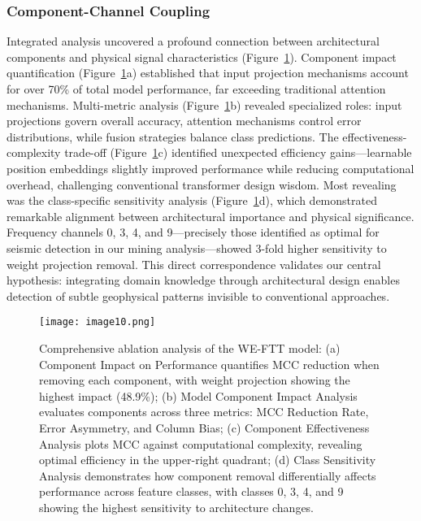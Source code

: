 \documentclass[fleqn,10pt]{wlscirep_mdpi_style}
\begin{document}
\subsubsection{Component-Channel Coupling}
Integrated analysis uncovered a profound connection between architectural components and physical signal characteristics (Figure~\ref{fig:fig10}). Component impact quantification (Figure~\ref{fig:fig10}a) established that input projection mechanisms account for over 70\% of total model performance, far exceeding traditional attention mechanisms. Multi-metric analysis (Figure~\ref{fig:fig10}b) revealed specialized roles: input projections govern overall accuracy, attention mechanisms control error distributions, while fusion strategies balance class predictions. The effectiveness-complexity trade-off (Figure~\ref{fig:fig10}c) identified unexpected efficiency gains—learnable position embeddings slightly improved performance while reducing computational overhead, challenging conventional transformer design wisdom.
Most revealing was the class-specific sensitivity analysis (Figure~\ref{fig:fig10}d), which demonstrated remarkable alignment between architectural importance and physical significance. Frequency channels 0, 3, 4, and 9—precisely those identified as optimal for seismic detection in our mining analysis—showed 3-fold higher sensitivity to weight projection removal. This direct correspondence validates our central hypothesis: integrating domain knowledge through architectural design enables detection of subtle geophysical patterns invisible to conventional approaches.

\begin{figure}[!htbp]
\centering
\texttt{[image: image10.png]}
\caption{Comprehensive ablation analysis of the WE-FTT model: (a) Component Impact on Performance quantifies MCC reduction when removing each component, with weight projection showing the highest impact (48.9\%); (b) Model Component Impact Analysis evaluates components across three metrics: MCC Reduction Rate, Error Asymmetry, and Column Bias; (c) Component Effectiveness Analysis plots MCC against computational complexity, revealing optimal efficiency in the upper-right quadrant; (d) Class Sensitivity Analysis demonstrates how component removal differentially affects performance across feature classes, with classes 0, 3, 4, and 9 showing the highest sensitivity to architecture changes.}
\label{fig:fig10}
\end{figure}
\end{document}
